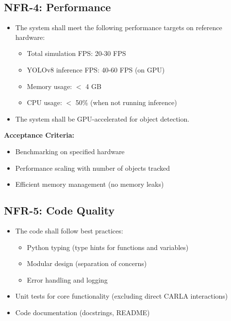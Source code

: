 \subsection{NFR-4: Performance}

\begin{itemize}
    \item The system shall meet the following performance targets on reference hardware:
    \begin{itemize}
        \item Total simulation FPS: 20-30 FPS
        \item YOLOv8 inference FPS: 40-60 FPS (on GPU)
        \item Memory usage: $<$ 4 GB
        \item CPU usage: $<$ 50\% (when not running inference)
    \end{itemize}
    \item The system shall be GPU-accelerated for object detection.
\end{itemize}

\textbf{Acceptance Criteria:}
\begin{itemize}
    \item Benchmarking on specified hardware
    \item Performance scaling with number of objects tracked
    \item Efficient memory management (no memory leaks)
\end{itemize}


\subsection{NFR-5: Code Quality}

\begin{itemize}
    \item The code shall follow best practices:
    \begin{itemize}
        \item Python typing (type hints for functions and variables)
        \item Modular design (separation of concerns)
        \item Error handling and logging
    \end{itemize}
    \item Unit tests for core functionality (excluding direct CARLA interactions)
    \item Code documentation (docstrings, README)
\end{itemize}

